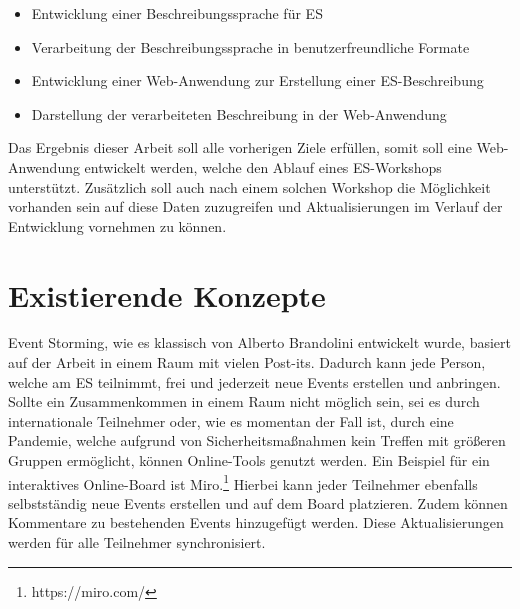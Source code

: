 \begin{itemize}
    \item Entwicklung einer Beschreibungssprache für \ac{ES}
    \item Verarbeitung der Beschreibungssprache in benutzerfreundliche Formate
    \item Entwicklung einer Web-Anwendung zur Erstellung einer \ac{ES}-Beschreibung
    \item Darstellung der verarbeiteten Beschreibung in der Web-Anwendung
\end{itemize}

Das Ergebnis dieser Arbeit soll alle vorherigen Ziele erfüllen, somit soll eine Web-Anwendung entwickelt werden,
welche den Ablauf eines \ac{ES}-Workshops unterstützt.
Zusätzlich soll auch nach einem solchen Workshop die Möglichkeit vorhanden sein auf diese Daten zuzugreifen und Aktualisierungen
im Verlauf der Entwicklung vornehmen zu können.


\section{Existierende Konzepte}\label{sec:existierende-konzepte}
Event Storming, wie es klassisch von Alberto Brandolini entwickelt wurde, basiert auf der Arbeit in einem Raum mit vielen Post-its.
Dadurch kann jede Person, welche am \ac{ES} teilnimmt, frei und jederzeit neue Events erstellen und anbringen.
Sollte ein Zusammenkommen in einem Raum nicht möglich sein, sei es durch internationale Teilnehmer oder, wie es momentan der Fall ist,
durch eine Pandemie, welche aufgrund von Sicherheitsmaßnahmen kein Treffen mit größeren Gruppen ermöglicht, können Online-Tools genutzt werden.
Ein Beispiel für ein interaktives Online-Board ist Miro.\footnote{https://miro.com/}
Hierbei kann jeder Teilnehmer ebenfalls selbstständig neue Events erstellen und auf dem Board platzieren.
Zudem können Kommentare zu bestehenden Events hinzugefügt werden.
Diese Aktualisierungen werden für alle Teilnehmer synchronisiert.


